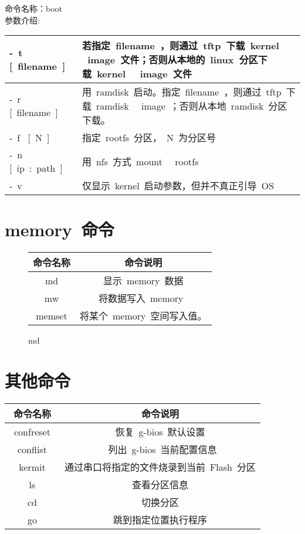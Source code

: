 \noindent 命令名称：boot\\
参数介绍:\\
\begin{table}[htbp]
\setlength{\parindent}{0pt}
\begin{tabular}{|p{2.5cm}|p{8.5cm}|}
\hline
-~t~ [~filename~] &若指定~filename~，则通过~tftp~下载~kernel~ ~image~文件；否则从本地的~linux~分区下载~kernel~ ~image~文件 \\ \hline
-~r~ [~filename~] &用~ramdisk~启动。指定~filename~，则通过~tftp~下载~ramdisk~ ~image~；否则从本地~ramdisk~分区下载。 \\ \hline
-~f~ [~N~] & 指定~rootfs~分区，~N~为分区号 \\ \hline
-~n~ [~ip~:~path~] & 用~nfs~方式~mount~ ~rootfs~ \\ \hline
-~v~ &仅显示~kernel~启动参数，但并不真正引导~OS~ \\ \hline
\end{tabular}
\end{table}
\pagebreak[4]

\section{memory~命令}
\begin{figure}[H]
\centering
\begin{tabular}{|c|c|}
\hline
命令名称 & 命令说明\\ \hline
md & 显示~memory~数据 \\ \hline
mw & 将数据写入~memory~ \\ \hline
memset & 将某个~memory~空间写入值。\\ \hline
\end{tabular}
\caption{md}
\end{figure}

\section{其他命令}
\begin{table}[htbp]
\setlength{\parindent}{0pt}
\begin{tabular}{|c|c|}
\hline
命令名称 & 命令说明\\
\hline
~confreset~ & 恢复~g-bios~默认设置\\ \hline
~conflist~ & ~列出~g-bios~当前配置信息\\ \hline
~kermit~ &通过串口将指定的文件烧录到当前~Flash~分区 \\ \hline
~ls~ & 查看分区信息\\ \hline
~cd~ & 切换分区\\ \hline
~go~ & 跳到指定位置执行程序\\ \hline
\end{tabular}
\end{table}

